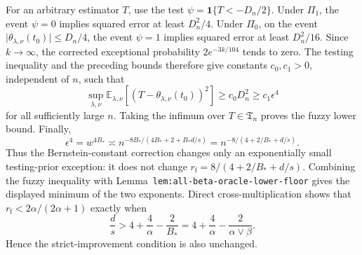 For an arbitrary estimator \(T\), use the test \(\psi=\mathbf 1\{T<-D_n/2\}\). Under \(\Pi_1\), the event \(\psi=0\) implies squared error at least \(D_n^2/4\). Under \(\Pi_0\), on the event \(\lvert\theta_{\lambda,\nu}(t_0)\rvert\le D_n/4\), the event \(\psi=1\) implies squared error at least \(D_n^2/16\). Since \(k\to\infty\), the corrected exceptional probability \(2e^{-3k/104}\) tends to zero. The testing inequality and the preceding bounds therefore give constants \(c_0,c_1>0\), independent of \(n\), such that
\[
\sup_{\lambda,\nu}
\mathbb E_{\lambda,\nu}[(T-\theta_{\lambda,\nu}(t_0))^2]
\ge c_0D_n^2
\ge c_1\epsilon^4
\]
for all sufficiently large \(n\). Taking the infimum over \(T\in\mathfrak T_n\) proves the fuzzy lower bound. Finally,
\[
\epsilon^4=w^{4B_*}
\asymp
n^{-8B_*/(4B_*+2+B_*d/s)}
=
n^{-8/(4+2/B_*+d/s)}.
\]
Thus the Bernstein-constant correction changes only an exponentially small testing-prior exception: it does not change \(r_{\mathrm f}=8/(4+2/B_*+d/s)\). Combining the fuzzy inequality with Lemma~\texttt{lem:all-beta-oracle-lower-floor} gives the displayed minimum of the two exponents. Direct cross-multiplication shows that \(r_{\mathrm f}<2\alpha/(2\alpha+1)\) exactly when
\[
\frac ds>4+\frac4\alpha-\frac{2}{B_*}
=4+\frac4\alpha-\frac{2}{\alpha\vee\beta}.
\]
Hence the strict-improvement condition is also unchanged.
